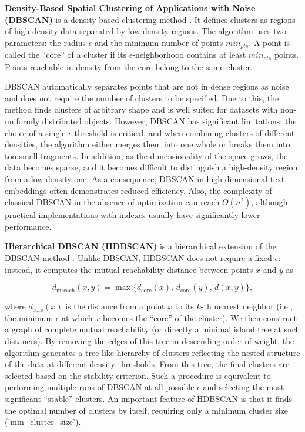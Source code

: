\textbf{Density-Based Spatial Clustering of Applications with Noise (DBSCAN)} is a density-based
clustering method \parencite{DBSCAN1996}. It defines clusters as regions of high-density data separated
by low-density regions. The algorithm uses two parameters: the radius $\epsilon$ and the minimum
number of points $min_{pts}$. A point is called the “core” of a cluster if its $\epsilon$-neighborhood
contains at least $min_{pts}$ points. Points reachable in density from the core belong to the same
cluster.

DBSCAN automatically separates points that are not in dense regions as noise and does not require
the number of clusters to be specified. Due to this, the method finds clusters of arbitrary shape
and is well suited for datasets with non-uniformly distributed objects. However, DBSCAN has significant
limitations: the choice of a single $\epsilon$ threshold is critical, and when combining clusters
of different densities, the algorithm either merges them into one whole or breaks them into too small
fragments. In addition, as the dimensionality of the space grows, the data becomes sparse, and it becomes
difficult to distinguish a high-density region from a low-density one. As a consequence, DBSCAN
in high-dimensional text embeddings often demonstrates reduced efficiency. Also, the complexity
of classical DBSCAN in the absence of optimization can reach $O(n^2)$, although practical implementations
with indexes usually have significantly lower performance.

\textbf{Hierarchical DBSCAN (HDBSCAN)} is a hierarchical extension of the DBSCAN method \parencite{HDBSCAN2013}.
Unlike DBSCAN, HDBSCAN does not require a fixed $\epsilon$: instead, it computes the mutual reachability
distance between points $x$ and $y$ as

\begin{equation}
    d_{\mathrm{mreach}}(x,y) = \max\bigl\{d_{\mathrm{core}}(x),\,d_{\mathrm{core}}(y),\,d(x,y)\bigr\},
\end{equation}

where $d_{\mathrm{core}}(x)$ is the distance from a point $x$ to its $k$-th nearest neighbor (i.e.,
the minimum $\epsilon$ at which $x$ becomes the “core” of the cluster). We then construct a graph
of complete mutual reachability (or directly a minimal island tree at such distances). By removing
the edges of this tree in descending order of weight, the algorithm generates a tree-like hierarchy
of clusters reflecting the nested structure of the data at different density thresholds. From this tree,
the final clusters are selected based on the stability criterion. Such a procedure is equivalent
to performing multiple runs of DBSCAN at all possible $\epsilon$ and selecting the most significant
“stable” clusters. An important feature of HDBSCAN is that it finds the optimal number of clusters
by itself, requiring only a minimum cluster size ('min\_cluster\_size').

